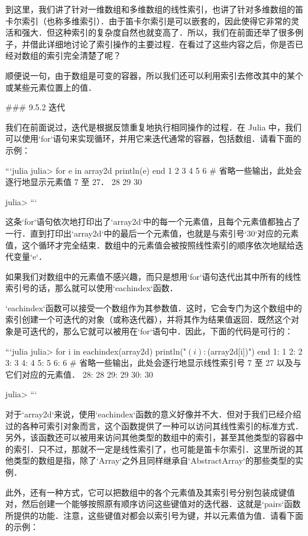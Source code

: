 到这里，我们讲了针对一维数组和多维数组的线性索引，也讲了针对多维数组的笛卡尔索引（也称多维索引）．由于笛卡尔索引是可以嵌套的，因此使得它非常的灵活和强大．但这种索引的复杂度自然也就变高了．所以，我们在前面还举了很多例子，并借此详细地讨论了索引操作的主要过程．在看过了这些内容之后，你是否已经对数组的索引完全清楚了呢？

顺便说一句，由于数组是可变的容器，所以我们还可以利用索引去修改其中的某个或某些元素位置上的值．

### 9.5.2 迭代

我们在前面说过，迭代是根据反馈重复地执行相同操作的过程．在 Julia 中，我们可以使用`for`语句来实现循环，并用它来迭代通常的容器，包括数组．请看下面的示例：

```julia
julia> for e in array2d
           println(e)
       end
1
2
3
4
5
6
# 省略一些输出，此处会逐行地显示元素值 7 至 27．
28
29
30

julia> 
```

这条`for`语句依次地打印出了`array2d`中的每一个元素值，且每个元素值都独占了一行．直到打印出`array2d`中的最后一个元素值，也就是与索引号`30`对应的元素值，这个循环才完全结束．数组中的元素值会被按照线性索引的顺序依次地赋给迭代变量`e`．

如果我们对数组中的元素值不感兴趣，而只是想用`for`语句迭代出其中所有的线性索引号的话，那么就可以使用`eachindex`函数．

`eachindex`函数可以接受一个数组作为其参数值．这时，它会专门为这个数组中的索引创建一个可迭代的对象（或称迭代器），并将其作为结果值返回．既然这个对象是可迭代的，那么它就可以被用在`for`语句中．因此，下面的代码是可行的：

```julia
julia> for i in eachindex(array2d)
           println("$(i): $(array2d[i])")
       end
1: 1
2: 2
3: 3
4: 4
5: 5
6: 6
# 省略一些输出，此处会逐行地显示线性索引号 7 至 27 以及与它们对应的元素值．
28: 28
29: 29
30: 30

julia> 
```

对于`array2d`来说，使用`eachindex`函数的意义好像并不大．但对于我们已经介绍过的各种可索引对象而言，这个函数提供了一种可以访问其线性索引的标准方式．另外，该函数还可以被用来访问其他类型的数组中的索引，甚至其他类型的容器中的索引．只不过，那就不一定是线性索引了，也可能是笛卡尔索引．这里所说的其他类型的数组是指，除了`Array`之外且同样继承自`AbstractArray`的那些类型的实例．

此外，还有一种方式，它可以把数组中的各个元素值及其索引号分别包装成键值对，然后创建一个能够按照原有顺序访问这些键值对的迭代器．这就是`pairs`函数所提供的功能．注意，这些键值对都会以索引号为键，并以元素值为值．请看下面的示例：

